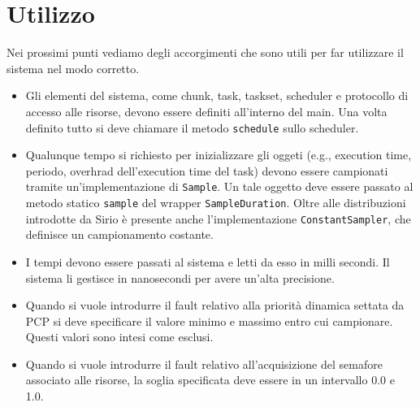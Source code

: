 \section{Utilizzo}
Nei prossimi punti vediamo degli accorgimenti che sono utili per far utilizzare il sistema nel modo corretto.
\begin{itemize}
    \item Gli elementi del sistema, come chunk, task, taskset, scheduler e protocollo di accesso alle risorse, devono essere definiti all'interno del main. Una volta definito tutto si deve chiamare il metodo \texttt{schedule} sullo scheduler.
    \item Qualunque tempo si richiesto per inizializzare gli oggeti (e.g., execution time, periodo, overhrad dell'execution time del task) devono essere campionati tramite un'implementazione di \texttt{Sample}. Un tale oggetto deve essere passato al metodo statico \texttt{sample} del wrapper \texttt{SampleDuration}. Oltre alle distribuzioni introdotte da Sirio è presente anche l'implementazione \texttt{ConstantSampler}, che definisce un campionamento costante.
    \item I tempi devono essere passati al sistema e letti da esso in milli secondi. Il sistema li gestisce in nanosecondi per avere un'alta precisione.
    \item Quando si vuole introdurre il fault relativo alla priorità dinamica settata da PCP si deve specificare il valore minimo e massimo entro cui campionare. Questi valori sono intesi come esclusi.
    \item Quando si vuole introdurre il fault relativo all'acquisizione del semafore associato alle risorse, la soglia specificata deve essere in un intervallo 0.0 e 1.0.
\end{itemize}